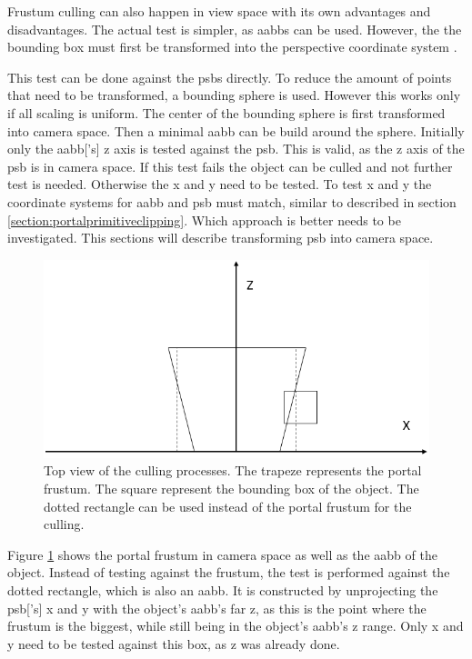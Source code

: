 Frustum culling can also happen in view space  with its own advantages and disadvantages. The actual test is simpler, as \glspl{aabb} can be used. However, the the bounding box must first be transformed into the perspective coordinate system \cite{assarsson:2000:optimized}.


This test can be done against the \glspl{psb} directly. To reduce the amount of points that need to be transformed, a bounding sphere is used. However this works only if all scaling is uniform. The center of the bounding sphere is first transformed into camera space. Then a minimal \gls{aabb} can be build around the sphere. Initially only the \gls{aabb}['s] z axis is tested against the \gls{psb}. This is valid, as the z axis of the \gls{psb} is in camera space. If this test fails the object can be culled and not further test is needed. Otherwise the x and y need to be tested. To test x and y  the coordinate systems for \gls{aabb} and \gls{psb} must match, similar to described in section \ref{section:portalprimitiveclipping}. Which approach is better needs to be investigated. This sections will describe transforming \gls{psb} into camera space. 

\begin{figure}[h]
	\includegraphics[width=\linewidth]{images/frustumbox.png}
	\caption{Top view of the culling processes. The trapeze represents the portal frustum. The square represent the bounding box of the object. The dotted rectangle can be used instead of the portal frustum for the culling. }
	\label{fig:frustumbox}
\end{figure}

Figure \ref{fig:frustumbox} shows the portal frustum in camera space as well as the \gls{aabb} of the object. Instead of testing against the frustum, the test is performed against the dotted rectangle, which is also an \gls{aabb}. It is constructed by unprojecting the \gls{psb}['s] x and y with the object's \gls{aabb}'s far z, as this is the point where the frustum is the biggest, while still being in the object's \gls{aabb}'s z range. Only x and y need to be tested against this box, as z was already done.



